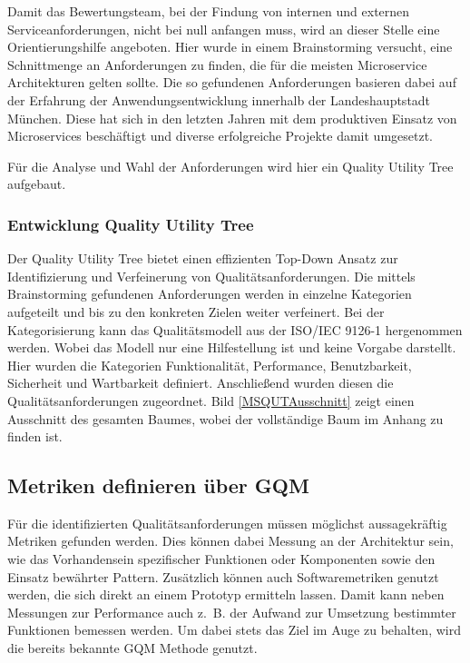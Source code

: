 Damit das Bewertungsteam, bei der Findung von internen und externen Serviceanforderungen, nicht bei null anfangen muss, wird an dieser Stelle eine Orientierungshilfe angeboten. Hier wurde in einem Brainstorming versucht, eine Schnittmenge an Anforderungen zu finden, die für die meisten Microservice Architekturen gelten sollte. 
Die so gefundenen Anforderungen basieren dabei auf der Erfahrung der Anwendungsentwicklung innerhalb der Landeshauptstadt München. Diese hat sich in den letzten Jahren mit dem produktiven Einsatz von Microservices beschäftigt und diverse erfolgreiche Projekte damit umgesetzt.   

Für die Analyse und Wahl der Anforderungen wird hier ein Quality Utility Tree aufgebaut.

\subsubsection{Entwicklung Quality Utility Tree}

Der Quality Utility Tree bietet einen effizienten Top-Down Ansatz zur Identifizierung und Verfeinerung von Qualitätsanforderungen. Die mittels Brainstorming gefundenen Anforderungen werden in einzelne Kategorien aufgeteilt und bis zu den konkreten Zielen weiter verfeinert. Bei der Kategorisierung kann das Qualitätsmodell aus der ISO/IEC 9126-1 hergenommen werden. Wobei das Modell nur eine Hilfestellung ist und keine Vorgabe darstellt. Hier wurden die Kategorien Funktionalität, Performance, Benutzbarkeit, Sicherheit und Wartbarkeit definiert. Anschließend wurden diesen die Qualitätsanforderungen zugeordnet. Bild \ref{MSQUTAusschnitt} zeigt einen Ausschnitt des gesamten Baumes, wobei der vollständige Baum im Anhang zu finden ist. 


\subsection{Metriken definieren über \ac{GQM}}

Für die identifizierten Qualitätsanforderungen müssen möglichst aussagekräftig Metriken gefunden werden. Dies können dabei Messung an der Architektur sein, wie das Vorhandensein spezifischer Funktionen oder Komponenten sowie den Einsatz bewährter Pattern. Zusätzlich können auch Softwaremetriken genutzt werden, die sich direkt an einem Prototyp ermitteln lassen. Damit kann neben Messungen zur Performance auch z. B. der Aufwand zur Umsetzung bestimmter Funktionen bemessen werden. Um dabei stets das Ziel im Auge zu behalten, wird die bereits bekannte \ac{GQM} Methode genutzt. 

